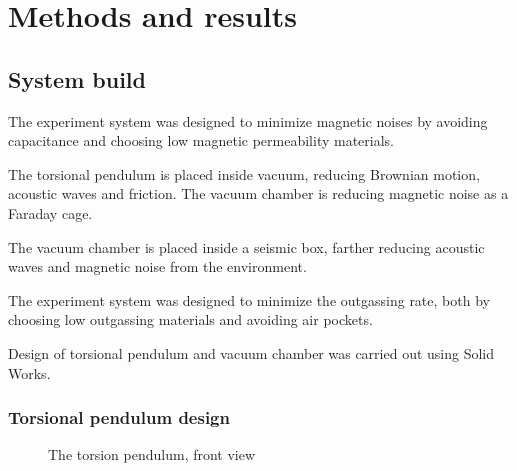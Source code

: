 \documentclass[\main/master.tex]{subfiles}
\begin{document}
\chapter{Methods and results}\label{chp:example-2}

\section{System build}
\par\noindent
The experiment system was designed to minimize magnetic noises by avoiding capacitance and choosing low magnetic permeability materials.
\par\noindent
The torsional pendulum is placed inside vacuum, reducing Brownian motion, acoustic waves and friction. The vacuum chamber is reducing magnetic noise as a Faraday cage.
\par\noindent
The vacuum chamber is placed inside a seismic box, farther reducing acoustic waves and magnetic noise from the environment.

\par\noindent
The experiment system was designed to minimize the outgassing rate, both by choosing low outgassing materials and avoiding air pockets. 
\par\noindent
Design of torsional pendulum and vacuum chamber was carried out using Solid Works.

\subsection{Torsional pendulum design}
\begin{figure}[htbp]
	\centering
	\caption[The torsion pendulum, front view]{The torsion pendulum, front view}
	\label{fig:pendulum front}
\end{figure}
\FloatBarrier
\end{document}
